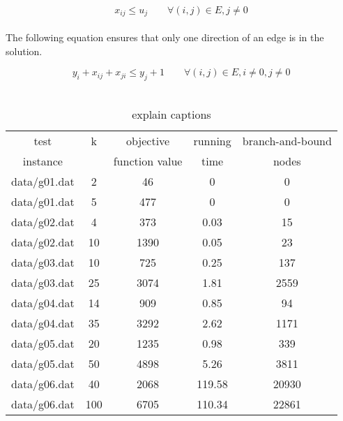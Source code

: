\begin{equation}
  x_{ij} \leq u_j \qquad \forall (i,j) \in E, j \neq 0
\end{equation}
\\
The following equation ensures that only one direction of an edge is in the solution.

\begin{equation}
 y_{i} + x_{ij} + x_{ji} \leq y_{j} + 1 \qquad \forall (i,j) \in E, i \neq 0, j \neq 0
\end{equation}
\\

\begin{table} 
\small
\centering
\begin{tabular}{ccccc}
\hline
test     & k & objective      & running & branch-and-bound \\
instance &   & function value & time    & nodes \\
\hline
data/g01.dat		& 2	& 46	& 0	& 0	\\ 
data/g01.dat		& 5	& 477	& 0	& 0	\\ 
data/g02.dat		& 4	& 373	& 0.03	& 15	\\ 
data/g02.dat		& 10	& 1390	& 0.05	& 23	\\
data/g03.dat		& 10	& 725	& 0.25	& 137	\\ 
data/g03.dat		& 25	& 3074	& 1.81	& 2559	\\ 
data/g04.dat		& 14	& 909	& 0.85	& 94	\\ 
data/g04.dat		& 35	& 3292	& 2.62	& 1171	\\ 
data/g05.dat		& 20	& 1235	& 0.98	& 339	\\ 
data/g05.dat		& 50	& 4898	& 5.26	& 3811	\\ 
data/g06.dat		& 40	& 2068	& 119.58	& 20930	\\ 
data/g06.dat		& 100	& 6705	& 110.34	& 22861	\\ 

\hline
\end{tabular}
\caption{explain captions}
\label{tbl:scf_fast}
\end{table}
